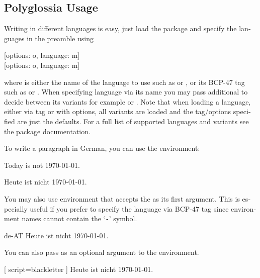 \subsection{Polyglossia Usage}

Writing in different languages is easy, just load the  package
and specify the languages in the preamble using
\begin{lscommand}
  [options: o, language: m] \\
  [options: o, language: m]
\end{lscommand}
where  is either the name of the language to use such as
 or , or its BCP-47 tag such as  or
. When specifying language via its name you may pass
additional  to decide between its variants for example
 or . Note that when loading a
language, either via tag or with options, all variants are loaded and the
tag\slash{}options specified are just the defaults. For a full list of
supported languages and variants see the  package
documentation.

To write a paragraph in German, you can use the  environment:

\begin{example}
\setdefaultlanguage{english}
Today is not \today.

\begin{german}
  Heute ist nicht \today.
\end{german}
\end{example}

You may also use  environment that accepts the  as its
first argument. This is especially useful if you prefer to specify the language
via BCP-47 tag since environment names cannot contain the
\enquote*{\texttt{-}} symbol.
\begin{example}
\begin{lang}{de-AT}
  Heute ist nicht \today.
\end{lang}
\end{example}

You can also pass  as an optional argument to the environment.
\begin{example}
\begin{german}[
  script=blackletter
]
  Heute ist nicht \today.
\end{german}
\end{example}


